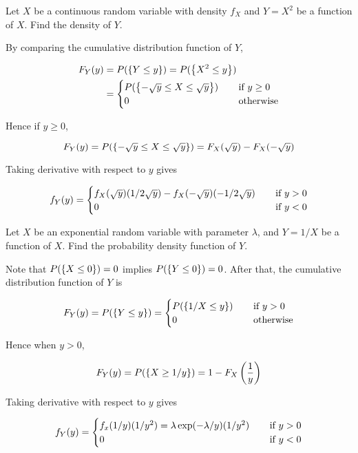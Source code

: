 \documentclass[a4paper,12pt]{article}
\begin{document}
\begin{exm}
  Let $X$ be a continuous random variable with density $f_{X}$ and $Y=X^{2}$ be a function of $X$. Find the density of $Y$.\n

  \ans By comparing the cumulative distribution function of $Y$,

  $$\begin{aligned}[t]
    F_{Y}(y)&=P(\left\{ Y\leq y\right\})=P(\left\{ X^{2}\leq y\right\})\\
    &=\begin{cases}
      P(\left\{ -\sqrt{y}\leq X\leq\sqrt{y}\right\})&\;\;\;\;\text{if }y\geq 0\\
      0&\;\;\;\;\text{otherwise}
    \end{cases}
  \end{aligned}$$\s

  Hence if $y\geq 0$,

  $$F_{Y}(y)=P(\left\{ -\sqrt{y}\leq X\leq\sqrt{y}\right\})=F_{X}(\sqrt{y})-F_{X}(-\sqrt{y})$$\s

  Taking derivative with respect to $y$ gives

  $$f_{Y}(y)=\begin{cases}
    f_{X}(\sqrt{y})(1/2\sqrt{y})-f_{X}(-\sqrt{y})(-1/2\sqrt{y})&\;\;\;\;\text{if }y>0\\
    0&\;\;\;\;\text{if }y<0
  \end{cases}$$
\end{exm}\n

\begin{exm}
  Let $X$ be an exponential random variable with parameter $\lambda$, and $Y=1/X$ be a function of $X$. Find the probability density function of $Y$.\n

  \ans Note that $P(\left\{ X\leq 0\right\})=0$ implies $P(\left\{ Y\leq 0\right\})=0$. After that, the cumulative distribution function of $Y$ is

  $$F_{Y}(y)=P(\left\{ Y\leq y\right\})=\begin{cases}
    P(\left\{ 1/X\leq y\right\})&\;\;\;\;\text{if }y>0\\
    0&\;\;\;\;\text{otherwise}
  \end{cases}$$\s

  Hence when $y>0$,

  $$F_{Y}(y)=P(\left\{ X\geq 1/y\right\})=1-F_{X}\left( \frac{1}{y}\right)$$\s

  Taking derivative with respect to $y$ gives

  $$f_{Y}(y)=\begin{cases}
    f_{x}(1/y)(1/y^{2})=\lambda\exp(-\lambda/y)(1/y^{2})&\;\;\;\;\text{if }y>0\\
    0&\;\;\;\;\text{if }y<0
  \end{cases}$$
\end{exm}\n
\end{document}
